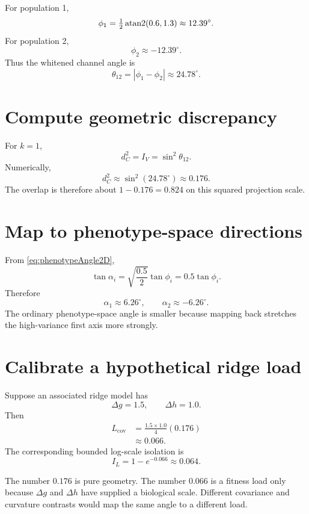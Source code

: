 For population 1,
\begin{equation}
\phi_1
=\tfrac12\operatorname{atan2}(0.6,1.3)
\approx12.39^\circ.
\end{equation}
For population 2,
\begin{equation}
\phi_2\approx-12.39^\circ.
\end{equation}
Thus the whitened channel angle is
\begin{equation}
\theta_{12}=|\phi_1-\phi_2|
\approx24.78^\circ.
\end{equation}

\section{Compute geometric discrepancy}

For \(k=1\),
\begin{equation}
d_C^2=I_V=\sin^2\theta_{12}.
\end{equation}
Numerically,
\begin{equation}
d_C^2\approx\sin^2(24.78^\circ)\approx0.176.
\end{equation}
The overlap is therefore about \(1-0.176=0.824\) on this squared projection scale.

\section{Map to phenotype-space directions}

From \cref{eq:phenotypeAngle2D},
\begin{equation}
\tan\alpha_i
=\sqrt{\frac{0.5}{2}}\tan\phi_i
=0.5\tan\phi_i.
\end{equation}
Therefore
\begin{equation}
\alpha_1\approx6.26^\circ,
\qquad
\alpha_2\approx-6.26^\circ.
\end{equation}
The ordinary phenotype-space angle is smaller because mapping back stretches the high-variance first axis more strongly.

\section{Calibrate a hypothetical ridge load}

Suppose an associated ridge model has
\begin{equation}
\Delta g=1.5,
\qquad
\Delta h=1.0.
\end{equation}
Then
\begin{align}
L_{\mathrm{cov}}
&=\frac{1.5\times1.0}{4}(0.176)\\
&\approx0.066.
\end{align}
The corresponding bounded log-scale isolation is
\begin{equation}
I_L=1-e^{-0.066}\approx0.064.
\end{equation}

\begin{cautionbox}
The number \(0.176\) is pure geometry. The number \(0.066\) is a fitness load only because \(\Delta g\) and \(\Delta h\) have supplied a biological scale. Different covariance and curvature contrasts would map the same angle to a different load.
\end{cautionbox}

